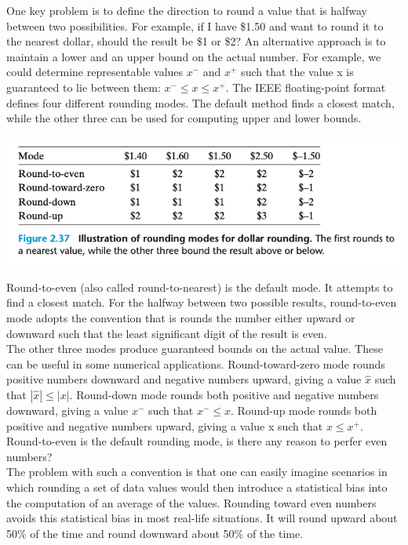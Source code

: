 \documentclass[11pt]{article}
\begin{document}
One key problem is to define the direction to round a value that is halfway between two possibilities. For example, if I have \$1.50 and want to round it to the nearest dollar, should the result be \$1 or \$2? An alternative approach is to maintain a lower and an upper bound on the actual number. For example, we could determine representable values \(x^{-}\) and \(x^{+}\) such that the value x is guaranteed to lie between them: \(x^{-} \le x \le x^{+}\). The IEEE floating-point format defines four different rounding modes. The default method finds a closest match, while the other three can be used for computing upper and lower bounds.\\

\begin{center}
\includegraphics[width=.9\linewidth]{pics/rounding-modes.png}
\end{center}

Round-to-even (also called round-to-nearest) is the default mode. It attempts to find a closest match. For the halfway between two possible results, round-to-even mode adopts the convention that is rounds the number either upward or downward such that the least significant digit of the result is even.\\

The other three modes produce guaranteed bounds on the actual value. These can be useful in some numerical applications. Round-toward-zero mode rounds positive numbers downward and negative numbers upward, giving a value \(\hat{x}\) such that \(|\hat{x}| \le |x|\). Round-down mode rounds both positive and negative numbers downward, giving a value \(x^{-}\) such that \(x^{-} \le x\). Round-up mode rounds both positive and negative numbers upward, giving a value x such that \(x \le x^{+}\).\\

Round-to-even is the default rounding mode, is there any reason to perfer even numbers?\\
The problem with such a convention is that one can easily imagine scenarios in which rounding a set of data values would then introduce a statistical bias into the computation of an average of the values. Rounding toward even numbers avoids this statistical bias in most real-life situations. It will round upward about 50\% of the time and round downward about 50\% of the time.\\
\end{document}

